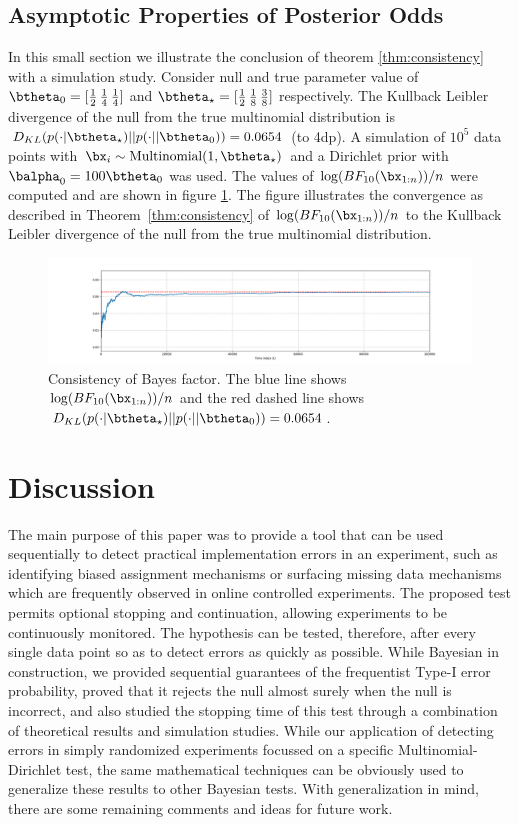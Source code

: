 \documentclass[11pt]{article}
\def\log{{\rm log}}
\begin{document}
\subsection{Asymptotic Properties of Posterior Odds}
In this small section we illustrate the conclusion of theorem \ref{thm:consistency} with a simulation study.
Consider null and true parameter value of $\btheta_0=[\frac{1}{2}\, \frac{1}{4}\, \frac{1}{4}]$ and $\btheta_\star=[\frac{1}{2}\, \frac{1}{8}\, \frac{3}{8}]$ respectively.
The Kullback Leibler divergence of the null from the true multinomial distribution is $D_{KL}(p(\cdot|\btheta_\star)||p(\cdot||\btheta_0)) = 0.0654$ (to 4dp).
A simulation of $10^5$ data points with $\bx_i \sim \text{Multinomial}(1, \btheta_\star)$ and a Dirichlet prior with $\balpha_0 = 100\btheta_0$ was used.
The values of $\log(BF_{10}(\bx_{1:n}))/n$ were computed and are shown in figure \ref{fig:lbf}.
The figure illustrates the convergence as described in Theorem~\ref{thm:consistency} of $\log(BF_{10}(\bx_{1:n}))/n$ to the Kullback Leibler divergence of the null from the true multinomial distribution.
\begin{figure}[H]
  \centering
  \includegraphics[scale=0.35]{images/consistency.png}
  \caption{Consistency of Bayes factor.
The blue line shows $\log(BF_{10}(\bx_{1:n}))/n$ and the red dashed line shows $D_{KL}(p(\cdot|\btheta_\star)||p(\cdot||\btheta_0)) = 0.0654$.}
    \label{fig:lbf}
  \end{figure}
  \section{Discussion}
  \label{sec:discussion}
The main purpose of this paper was to provide a tool that can be used sequentially to detect practical implementation errors in an experiment, such as identifying biased assignment mechanisms or surfacing missing data mechanisms which are frequently observed in online controlled experiments.
The proposed test permits optional stopping and continuation, allowing experiments to be continuously monitored.
The hypothesis can be tested, therefore, after every single data point so as to detect errors as quickly as possible.
While Bayesian in construction, we provided sequential guarantees of the frequentist Type-I error probability, proved that it rejects the null almost surely when the null is incorrect, and also studied the stopping time of this test through a combination of theoretical results and simulation studies.
While our application of detecting errors in simply randomized experiments focussed on a specific Multinomial-Dirichlet test, the same mathematical techniques can be obviously used to generalize these results to other Bayesian tests.
With generalization in mind, there are some remaining comments and ideas for future work.
\end{document}
